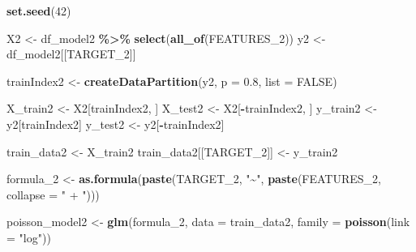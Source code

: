 \documentclass[
]{article}
\newenvironment{Shaded}{\begin{snugshade}}{\end{snugshade}}
\newcommand{\AttributeTok}[1]{\textcolor[rgb]{0.13,0.29,0.53}{#1}}
\newcommand{\ConstantTok}[1]{\textcolor[rgb]{0.56,0.35,0.01}{#1}}
\newcommand{\DecValTok}[1]{\textcolor[rgb]{0.00,0.00,0.81}{#1}}
\newcommand{\FloatTok}[1]{\textcolor[rgb]{0.00,0.00,0.81}{#1}}
\newcommand{\FunctionTok}[1]{\textcolor[rgb]{0.13,0.29,0.53}{\textbf{#1}}}
\newcommand{\NormalTok}[1]{#1}
\newcommand{\OtherTok}[1]{\textcolor[rgb]{0.56,0.35,0.01}{#1}}
\newcommand{\SpecialCharTok}[1]{\textcolor[rgb]{0.81,0.36,0.00}{\textbf{#1}}}
\newcommand{\StringTok}[1]{\textcolor[rgb]{0.31,0.60,0.02}{#1}}
\begin{document}
\begin{Shaded}
\begin{Highlighting}[]
\FunctionTok{set.seed}\NormalTok{(}\DecValTok{42}\NormalTok{)}

\NormalTok{X2 }\OtherTok{\textless{}{-}}\NormalTok{ df\_model2 }\SpecialCharTok{\%\textgreater{}\%} \FunctionTok{select}\NormalTok{(}\FunctionTok{all\_of}\NormalTok{(FEATURES\_2))}
\NormalTok{y2 }\OtherTok{\textless{}{-}}\NormalTok{ df\_model2[[TARGET\_2]]}

\NormalTok{trainIndex2 }\OtherTok{\textless{}{-}} \FunctionTok{createDataPartition}\NormalTok{(y2, }\AttributeTok{p =} \FloatTok{0.8}\NormalTok{, }\AttributeTok{list =} \ConstantTok{FALSE}\NormalTok{)}

\NormalTok{X\_train2 }\OtherTok{\textless{}{-}}\NormalTok{ X2[trainIndex2, ]}
\NormalTok{X\_test2 }\OtherTok{\textless{}{-}}\NormalTok{ X2[}\SpecialCharTok{{-}}\NormalTok{trainIndex2, ]}
\NormalTok{y\_train2 }\OtherTok{\textless{}{-}}\NormalTok{ y2[trainIndex2]}
\NormalTok{y\_test2 }\OtherTok{\textless{}{-}}\NormalTok{ y2[}\SpecialCharTok{{-}}\NormalTok{trainIndex2]}

\NormalTok{train\_data2 }\OtherTok{\textless{}{-}}\NormalTok{ X\_train2}
\NormalTok{train\_data2[[TARGET\_2]] }\OtherTok{\textless{}{-}}\NormalTok{ y\_train2}

\NormalTok{formula\_2 }\OtherTok{\textless{}{-}} \FunctionTok{as.formula}\NormalTok{(}\FunctionTok{paste}\NormalTok{(TARGET\_2, }\StringTok{"\textasciitilde{}"}\NormalTok{, }\FunctionTok{paste}\NormalTok{(FEATURES\_2, }\AttributeTok{collapse =} \StringTok{" + "}\NormalTok{)))}

\NormalTok{poisson\_model2 }\OtherTok{\textless{}{-}} \FunctionTok{glm}\NormalTok{(formula\_2, }\AttributeTok{data =}\NormalTok{ train\_data2, }\AttributeTok{family =} \FunctionTok{poisson}\NormalTok{(}\AttributeTok{link =} \StringTok{"log"}\NormalTok{))}
\end{Highlighting}
\end{Shaded}
\end{document}
